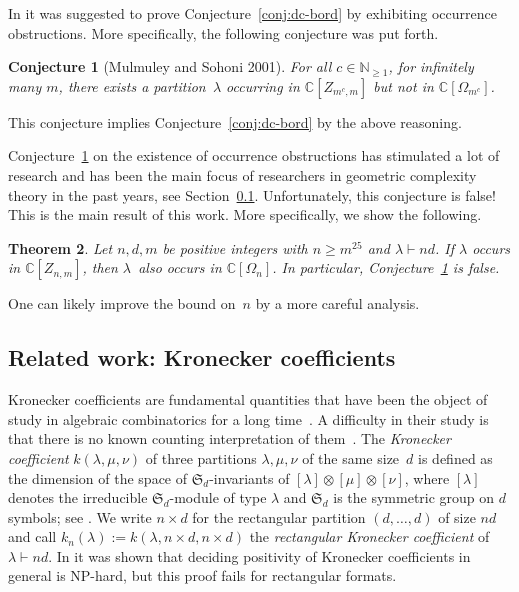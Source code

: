 \documentclass[11pt]{amsart}
\def\N{\mathbb{N}}
\def\C{\mathbb{C}}
\newcommand{\Det}{\Omega}
\def\la{\lambda}
\def\ot{\otimes}
\newcommand{\kron}{k}
\newcommand{\aS}{\ensuremath{\mathfrak{S}}}
\numberwithin{equation}{section}
\newtheorem{theorem}{Theorem}[section]
\newtheorem{conjecture}[theorem]{Conjecture}
\begin{document}
In \cite{gct1,gct2} it was suggested to prove Conjecture~\ref{conj:dc-bord} 
by exhibiting occurrence obstructions. 
More specifically, the following conjecture was put forth. 

\begin{conjecture}[Mulmuley and Sohoni 2001]\label{conj:occ-obstr}
For all $c\in\N_{\ge 1}$, 
for infinitely many $m$, 
there exists a partition~$\la$ 
occurring in $\C[Z_{m^c,m}]$ but not in $\C[\Det_{m^c}]$.
\end{conjecture}

This conjecture implies Conjecture~\ref{conj:dc-bord}
by the above reasoning. 

Conjecture~\ref{conj:occ-obstr} on the existence of occurrence obstructions  
has stimulated a lot of research and 
has been the main focus of researchers 
in geometric complexity theory
in the past years, see Section~\ref{se:prev-work}.
Unfortunately, this conjecture is false! This is the main result of this work.
More specifically, we show the following. 

\begin{theorem}\label{th:main}
Let $n,d,m$ be positive integers with 
$n \ge m^{25}$ and $\la\vdash nd$. If $\la$ occurs in 
$\C[Z_{n,m}]$, then $\la$~also occurs in $\C[\Omega_n]$. 
In particular, Conjecture~\ref{conj:occ-obstr} is false. 
\end{theorem}

One can likely improve the bound on~$n$ by a more careful analysis. 


\subsection{Related work: Kronecker coefficients}\label{se:prev-work}

Kronecker coefficients are fundamental quantities that 
have been the object of study in algebraic combinatorics 
for a long time~\cite{murna:38}. 
A difficulty in their study is that there is no known counting interpretation 
of them~\cite{stanley:00}. 
%
The {\em Kronecker coefficient} $\kron(\la,\mu,\nu)$ 
of three partitions $\la,\mu,\nu$ of the same size~$d$
is defined as the dimension of the space of $\aS_d$-invariants 
of $[\la]\ot [\mu]\ot [\nu]$, where $[\la]$ denotes the 
irreducible $\aS_d$-module of type $\la$
and $\aS_d$ is the symmetric group on $d$ symbols;  
see \cite[I\S7, internal product]{macdonald:95}. 
We write $n\times d$ for the rectangular 
partition $(d,\ldots,d)$ of size $nd$ and call 
$\kron_n(\la) := \kron(\la,n\times d,n\times d)$ 
the {\em rectangular Kronecker coefficient} 
of $\la\vdash nd$. 
In \cite{ik-m-w:15} it was shown that deciding positivity of 
Kronecker coefficients in general is NP-hard, but this proof 
fails for rectangular formats. 
\end{document}
